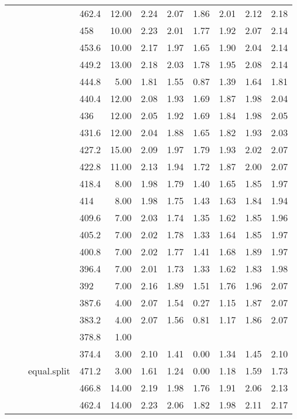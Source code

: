 \begin{longtable}{llllrrrrrrr}
   &  &  & 462.4 & 12.00 & 2.24 & 2.07 & 1.86 & 2.01 & 2.12 & 2.18 \\ 
   &  &  & 458 & 10.00 & 2.23 & 2.01 & 1.77 & 1.92 & 2.07 & 2.14 \\ 
   &  &  & 453.6 & 10.00 & 2.17 & 1.97 & 1.65 & 1.90 & 2.04 & 2.14 \\ 
   &  &  & 449.2 & 13.00 & 2.18 & 2.03 & 1.78 & 1.95 & 2.08 & 2.14 \\ 
   &  &  & 444.8 & 5.00 & 1.81 & 1.55 & 0.87 & 1.39 & 1.64 & 1.81 \\ 
   &  &  & 440.4 & 12.00 & 2.08 & 1.93 & 1.69 & 1.87 & 1.98 & 2.04 \\ 
   &  &  & 436 & 12.00 & 2.05 & 1.92 & 1.69 & 1.84 & 1.98 & 2.05 \\ 
   &  &  & 431.6 & 12.00 & 2.04 & 1.88 & 1.65 & 1.82 & 1.93 & 2.03 \\ 
   &  &  & 427.2 & 15.00 & 2.09 & 1.97 & 1.79 & 1.93 & 2.02 & 2.07 \\ 
   &  &  & 422.8 & 11.00 & 2.13 & 1.94 & 1.72 & 1.87 & 2.00 & 2.07 \\ 
   &  &  & 418.4 & 8.00 & 1.98 & 1.79 & 1.40 & 1.65 & 1.85 & 1.97 \\ 
   &  &  & 414 & 8.00 & 1.98 & 1.75 & 1.43 & 1.63 & 1.84 & 1.94 \\ 
   &  &  & 409.6 & 7.00 & 2.03 & 1.74 & 1.35 & 1.62 & 1.85 & 1.96 \\ 
   &  &  & 405.2 & 7.00 & 2.02 & 1.78 & 1.33 & 1.64 & 1.85 & 1.97 \\ 
   &  &  & 400.8 & 7.00 & 2.02 & 1.77 & 1.41 & 1.68 & 1.89 & 1.97 \\ 
   &  &  & 396.4 & 7.00 & 2.01 & 1.73 & 1.33 & 1.62 & 1.83 & 1.98 \\ 
   &  &  & 392 & 7.00 & 2.16 & 1.89 & 1.51 & 1.76 & 1.96 & 2.07 \\ 
   &  &  & 387.6 & 4.00 & 2.07 & 1.54 & 0.27 & 1.15 & 1.87 & 2.07 \\ 
   &  &  & 383.2 & 4.00 & 2.07 & 1.56 & 0.81 & 1.17 & 1.86 & 2.07 \\ 
   &  &  & 378.8 & 1.00 &  &  &  &  &  &  \\ 
   &  &  & 374.4 & 3.00 & 2.10 & 1.41 & 0.00 & 1.34 & 1.45 & 2.10 \\ 
   &  & equal.split & 471.2 & 3.00 & 1.61 & 1.24 & 0.00 & 1.18 & 1.59 & 1.73 \\ 
   &  &  & 466.8 & 14.00 & 2.19 & 1.98 & 1.76 & 1.91 & 2.06 & 2.13 \\ 
   &  &  & 462.4 & 14.00 & 2.23 & 2.06 & 1.82 & 1.98 & 2.11 & 2.17 \\ 

\end{longtable}
